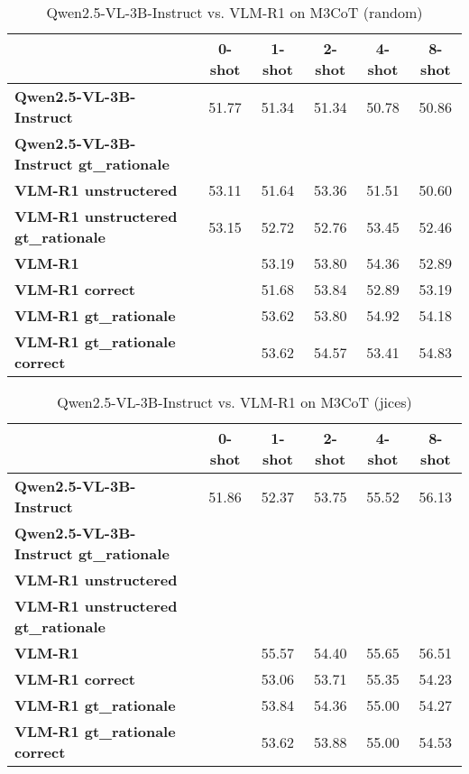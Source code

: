 \begin{table}
\caption{Qwen2.5-VL-3B-Instruct vs. VLM-R1 on M3CoT (random)}
\label{tab:Qwen2.5-VL-3B-Instruct_M3CoT_TRAIN_random}
\begin{tabular}{lccccc}
\toprule
 & 0-shot & 1-shot & 2-shot & 4-shot & 8-shot \\
\midrule
\textbf{Qwen2.5-VL-3B-Instruct} & 51.77 & 51.34 & 51.34 & 50.78 & 50.86 \\
\textbf{Qwen2.5-VL-3B-Instruct gt\_rationale} &  &  &  &  &  \\
\textbf{VLM-R1 unstructered} & 53.11 & 51.64 & 53.36 & 51.51 & 50.60 \\
\textbf{VLM-R1 unstructered gt\_rationale} & 53.15 & 52.72 & 52.76 & 53.45 & 52.46 \\
\textbf{VLM-R1} &  & 53.19 & 53.80 & 54.36 & 52.89 \\
\textbf{VLM-R1 correct} &  & 51.68 & 53.84 & 52.89 & 53.19 \\
\textbf{VLM-R1 gt\_rationale} &  & 53.62 & 53.80 & 54.92 & 54.18 \\
\textbf{VLM-R1 gt\_rationale correct} &  & 53.62 & 54.57 & 53.41 & 54.83 \\
\bottomrule
\end{tabular}
\end{table}


\begin{table}
\caption{Qwen2.5-VL-3B-Instruct vs. VLM-R1 on M3CoT (jices)}
\label{tab:Qwen2.5-VL-3B-Instruct_M3CoT_TRAIN_jices}
\begin{tabular}{lccccc}
\toprule
 & 0-shot & 1-shot & 2-shot & 4-shot & 8-shot \\
\midrule
\textbf{Qwen2.5-VL-3B-Instruct} & 51.86 & 52.37 & 53.75 & 55.52 & 56.13 \\
\textbf{Qwen2.5-VL-3B-Instruct gt\_rationale} &  &  &  &  &  \\
\textbf{VLM-R1 unstructered} &  &  &  &  &  \\
\textbf{VLM-R1 unstructered gt\_rationale} &  &  &  &  &  \\
\textbf{VLM-R1} &  & 55.57 & 54.40 & 55.65 & 56.51 \\
\textbf{VLM-R1 correct} &  & 53.06 & 53.71 & 55.35 & 54.23 \\
\textbf{VLM-R1 gt\_rationale} &  & 53.84 & 54.36 & 55.00 & 54.27 \\
\textbf{VLM-R1 gt\_rationale correct} &  & 53.62 & 53.88 & 55.00 & 54.53 \\
\bottomrule
\end{tabular}
\end{table}


